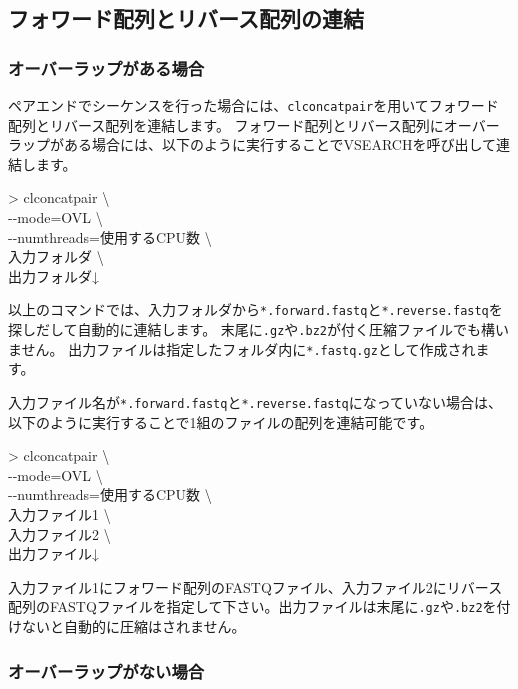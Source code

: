 \documentclass[titlepage,10pt,a4paper]{jsbook}
\newenvironment{cmd}{\begin{oframed}\raggedright\ttfamily\footnotesize\setlength{\baselineskip}{1.4em}}{\end{oframed}\vspace{-1em}}
\begin{document}
\subsection{フォワード配列とリバース配列の連結}\label{subsection:concatenatingpairedend}

\subsubsection{オーバーラップがある場合}

ペアエンドでシーケンスを行った場合には、\texttt{clconcatpair}を用いてフォワード配列とリバース配列を連結します。
フォワード配列とリバース配列にオーバーラップがある場合には、以下のように実行することでVSEARCHを呼び出して連結します。

\begin{cmd}
{\textgreater} clconcatpair {\textbackslash}\\
{-}{-}mode=OVL {\textbackslash}\\
{-}{-}numthreads=使用するCPU数 {\textbackslash}\\
入力フォルダ {\textbackslash}\\
出力フォルダ↓
\end{cmd}

以上のコマンドでは、入力フォルダから\texttt{*.forward.fastq}と\texttt{*.reverse.fastq}を探しだして自動的に連結します。
末尾に\texttt{.gz}や\texttt{.bz2}が付く圧縮ファイルでも構いません。
出力ファイルは指定したフォルダ内に\texttt{*.fastq.gz}として作成されます。

入力ファイル名が\texttt{*.forward.fastq}と\texttt{*.reverse.fastq}になっていない場合は、以下のように実行することで1組のファイルの配列を連結可能です。

\begin{cmd}
{\textgreater} clconcatpair {\textbackslash}\\
{-}{-}mode=OVL {\textbackslash}\\
{-}{-}numthreads=使用するCPU数 {\textbackslash}\\
入力ファイル1 {\textbackslash}\\
入力ファイル2 {\textbackslash}\\
出力ファイル↓
\end{cmd}

入力ファイル1にフォワード配列のFASTQファイル、入力ファイル2にリバース配列のFASTQファイルを指定して下さい。出力ファイルは末尾に\texttt{.gz}や\texttt{.bz2}を付けないと自動的に圧縮はされません。

\subsubsection{オーバーラップがない場合}
\end{document}
